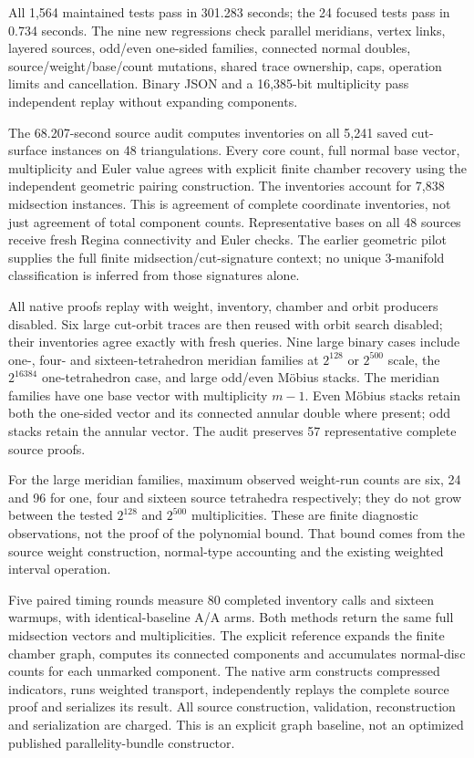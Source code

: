 All 1,564 maintained tests pass in 301.283 seconds; the 24 focused tests
pass in 0.734 seconds. The nine new regressions check parallel meridians,
vertex links, layered sources, odd/even one-sided families, connected normal
doubles, source/weight/base/count mutations, shared trace ownership, caps,
operation limits and cancellation. Binary JSON and a 16,385-bit multiplicity
pass independent replay without expanding components.

The 68.207-second source audit computes inventories on all 5,241 saved
cut-surface instances on 48 triangulations. Every core count, full normal
base vector, multiplicity and Euler value agrees with explicit finite chamber
recovery using the independent geometric pairing construction. The inventories
account for 7,838 midsection instances. This is agreement of complete
coordinate inventories, not just agreement of total component counts.
Representative bases on all 48 sources receive fresh Regina connectivity
and Euler checks. The earlier geometric pilot supplies the full finite
midsection/cut-signature context; no unique 3-manifold classification is
inferred from those signatures alone.

All native proofs replay with weight, inventory, chamber and orbit producers
disabled. Six large cut-orbit traces are then reused with orbit search
disabled; their inventories agree exactly with fresh queries. Nine large
binary cases include one-, four- and sixteen-tetrahedron meridian families
at $2^{128}$ or $2^{500}$ scale, the $2^{16384}$ one-tetrahedron case, and
large odd/even M\"obius stacks. The meridian families have one base vector
with multiplicity $m-1$. Even M\"obius stacks retain both the one-sided
vector and its connected annular double where present; odd stacks retain
the annular vector. The audit preserves 57 representative complete source
proofs.

For the large meridian families, maximum observed weight-run counts are
six, 24 and 96 for one, four and sixteen source tetrahedra respectively;
they do not grow between the tested $2^{128}$ and $2^{500}$ multiplicities.
These are finite diagnostic observations, not the proof of the polynomial
bound. That bound comes from the source weight construction, normal-type
accounting and the existing weighted interval operation.

Five paired timing rounds measure 80 completed inventory calls and sixteen
warmups, with identical-baseline A/A arms. Both methods return the same full
midsection vectors and multiplicities. The explicit reference expands the
finite chamber graph, computes its connected components and accumulates
normal-disc counts for each unmarked component. The native arm constructs
compressed indicators, runs weighted transport, independently replays the
complete source proof and serializes its result. All source construction,
validation, reconstruction and serialization are charged. This is an explicit
graph baseline, not an optimized published parallelity-bundle constructor.


